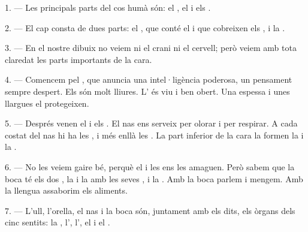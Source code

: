 
\VUsaut{4.0mm}
\VUsaut{2.0mm}

\VUsaut{2.4mm}
\VUsaut{3.0mm}

\VUsaut{3.0mm}

1. --- Les principals parts del cos humà són: el , el  i els
.

2. --- El cap consta de dues parts: el , que conté el
 i que cobreixen els , i la .

3. --- En el nostre dibuix no veiem ni el crani ni el cervell; però veiem amb tota claredat
les parts importants de la cara.

4. --- Comencem pel , que anuncia una intel·ligència poderosa, un pensament
sempre despert. Els  són molt lliures. L' és viu i ben obert. Una
 espessa i unes
 llargues el protegeixen.

5. --- Després venen el  i els . El nas ens serveix per olorar i
per respirar. A cada costat del nas hi ha les , i més enllà les
. La part inferior de la cara la formen la
 i la .

6. --- No les veiem gaire bé, perquè el  i les  ens les
amaguen. Però sabem que la boca té els dos , la
 i la  amb les seves
, i la . Amb la boca parlem i mengem. Amb la
llengua assaborim els aliments.

7. --- L'ull, l'orella, el nas i la boca són, juntament amb els dits, els òrgans dels cinc
sentits: la , l', l', el
 i el .

